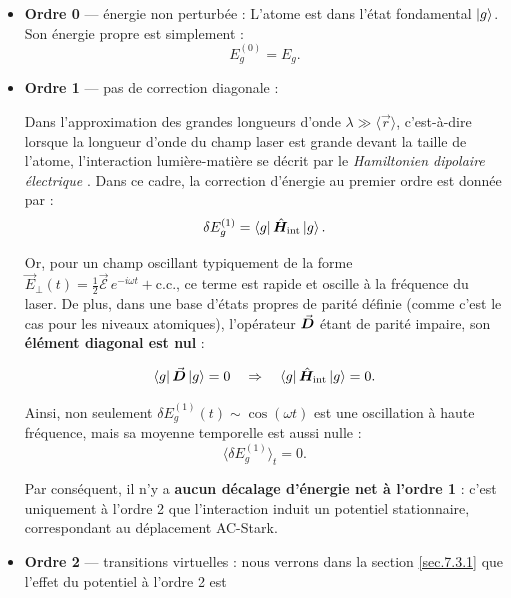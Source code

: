\begin{itemize}[label = $\bullet$] 
\item \textbf{Ordre 0} — énergie non perturbée :  
L’atome est dans l’état fondamental \( \ket{g} \). Son énergie propre est simplement :  
\begin{equation}
E_g^{(0)} = E_g.
\end{equation}

\item \textbf{Ordre 1} — pas de correction diagonale :  

Dans l’approximation des grandes longueurs d’onde \( \lambda \gg \langle \vec{r} \rangle \), c’est-à-dire lorsque la longueur d’onde du champ laser est grande devant la taille de l’atome, l’interaction lumière-matière se décrit par le \emph{Hamiltonien dipolaire électrique} . Dans ce cadre, la correction d’énergie au premier ordre est donnée par :
\begin{equation}
\delta E_g^{(1)} = \bra{g} \hat{\bm{H}}_{\text{int}} \ket{g}.
\end{equation}

Or, pour un champ oscillant typiquement de la forme \( \vec{E}_{\perp}(t) = \frac{1}{2} \vec{\mathcal{E}}\, e^{-i\omega t} + \text{c.c.} \), ce terme est rapide et oscille à la fréquence du laser. De plus, dans une base d’états propres de parité définie (comme c’est le cas pour les niveaux atomiques), l’opérateur \( \vec{{\bm{D}}} \) étant de parité impaire, son \textbf{élément diagonal est nul} :

\begin{equation}
\bra{g}  \vec{{\bm{D}}} \ket{g} = 0 \quad \Rightarrow \quad \bra{g} \hat{\bm{H}}_{\text{int}} \ket{g} = 0.
\end{equation}

Ainsi, non seulement \( \delta E_g^{(1)}(t) \sim \cos(\omega t) \) est une oscillation à haute fréquence, mais sa moyenne temporelle est aussi nulle :
\begin{equation}
\langle \delta E_g^{(1)} \rangle_t = 0.
\end{equation}

Par conséquent, il n’y a \textbf{aucun décalage d’énergie net à l’ordre 1} : c’est uniquement à l’ordre 2 que l’interaction induit un potentiel stationnaire, correspondant au déplacement AC-Stark.


\item \textbf{Ordre 2} — transitions virtuelles :  nous verrons dans la section \ref{sec.7.3.1} que l'effet du potentiel à l'ordre 2 est


\end{itemize}
